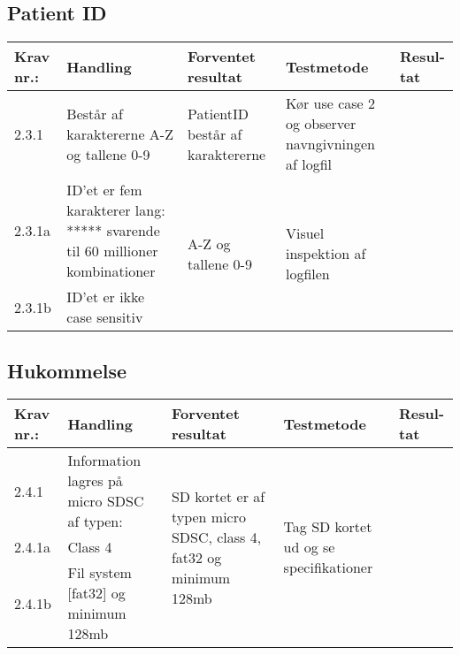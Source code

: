 \documentclass[11pt]{article}
\begin{document}
			\pagebreak
			\subsection{Patient ID}
			\begin{center}
				\begin{longtable}{|p{1.5cm}|p{2cm}|p{3cm}|p{3cm}|p{1.1cm}|}
					\hline
					Krav nr.: & Handling & Forventet resultat & Testmetode & Resul-tat  \\\hline
					2.3.1 & Består af karaktererne A-Z og tallene 0-9 & PatientID består af karaktererne  & Kør use case 2  og observer navngivningen af logfil & \\ \hline
					2.3.1a& ID’et er fem karakterer lang: ***** svarende til 60 millioner kombinationer & \multirow{2}{3cm}{A-Z og tallene 0-9} & \multirow{2}{3cm}{Visuel inspektion af logfilen}  & \multirow{2}{3cm}{} \\ \cline{1-2}
					2.3.1b& ID’et er ikke case sensitiv  & &  & \\ \hline
				\end{longtable}
			\end{center}
			
			\subsection{Hukommelse}
			\begin{center}
				\begin{longtable}{|p{1.5cm}|p{2cm}|p{3cm}|p{3cm}|p{1.1cm}|}
					\hline
					Krav nr.: & Handling & Forventet resultat & Testmetode & Resul-tat  \\\hline
					2.4.1& Information lagres på micro SDSC af typen: & \multirow{3}{3cm}{SD kortet er af typen micro SDSC, class 4, fat32 og minimum 128mb} & \multirow{3}{3cm}{Tag SD kortet ud og se specifikationer}  & \multirow{3}{3cm}{}  \\ \cline{1-2}
					2.4.1a& Class 4 & &  & \\ \cline{1-2}
					2.4.1b& Fil system [fat32] og minimum 128mb  & &  & \\ \hline
				\end{longtable}
			\end{center}
			
			\pagebreak
\end{document}
